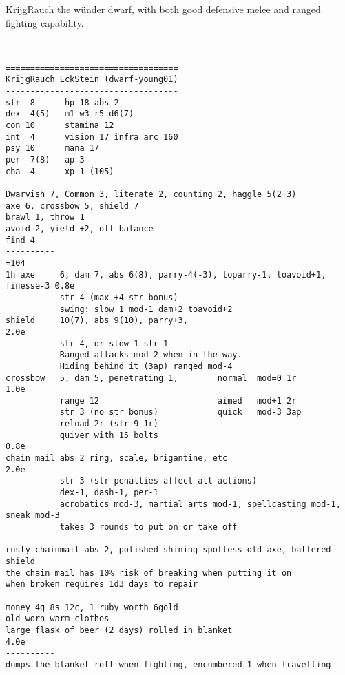\clearpage
\begin{samepage}

\noindent KrijgRauch the wünder dwarf, with both good defensive melee and ranged fighting capability.

\

\small \begin{verbatim}
===================================
KrijgRauch EckStein (dwarf-young01)
-----------------------------------
str  8      hp 18 abs 2
dex  4(5)   m1 w3 r5 d6(7)
con 10      stamina 12
int  4      vision 17 infra arc 160
psy 10      mana 17
per  7(8)   ap 3
cha  4      xp 1 (105)
----------
Dwarvish 7, Common 3, literate 2, counting 2, haggle 5(2+3)
axe 6, crossbow 5, shield 7
brawl 1, throw 1
avoid 2, yield +2, off balance
find 4
----------                                                                  =104
1h axe     6, dam 7, abs 6(8), parry-4(-3), toparry-1, toavoid+1, finesse-3 0.8e
           str 4 (max +4 str bonus)
           swing: slow 1 mod-1 dam+2 toavoid+2
shield     10(7), abs 9(10), parry+3,                                       2.0e
           str 4, or slow 1 str 1
           Ranged attacks mod-2 when in the way.
           Hiding behind it (3ap) ranged mod-4
crossbow   5, dam 5, penetrating 1,        normal  mod=0 1r                 1.0e
           range 12                        aimed   mod+1 2r
           str 3 (no str bonus)            quick   mod-3 3ap
           reload 2r (str 9 1r)
           quiver with 15 bolts                                             0.8e
chain mail abs 2 ring, scale, brigantine, etc                               2.0e
           str 3 (str penalties affect all actions)
           dex-1, dash-1, per-1
           acrobatics mod-3, martial arts mod-1, spellcasting mod-1, sneak mod-3
           takes 3 rounds to put on or take off

rusty chainmail abs 2, polished shining spotless old axe, battered shield
the chain mail has 10% risk of breaking when putting it on
when broken requires 1d3 days to repair

money 4g 8s 12c, 1 ruby worth 6gold
old worn warm clothes
large flask of beer (2 days) rolled in blanket                              4.0e
----------
dumps the blanket roll when fighting, encumbered 1 when travelling
\end{verbatim} \end{samepage} \normalsize






